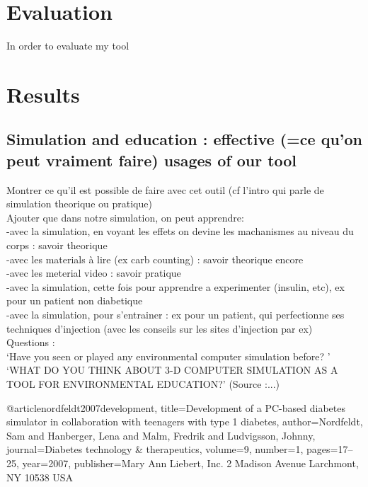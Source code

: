 \section{Evaluation}
In order to evaluate my tool\\

\section{Results}
\subsection{Simulation and education : effective (=ce qu'on peut vraiment faire) usages of our tool}
\label{sec:simulationUsages}
Montrer ce qu'il est possible de faire avec cet outil (cf l'intro qui parle de simulation theorique ou pratique)\\
Ajouter que dans notre simulation, on peut apprendre:\\
-avec la simulation, en voyant les effets on devine les machanismes au niveau du corps : savoir theorique\\
-avec les materials à lire (ex carb counting) : savoir theorique encore\\
-avec les meterial video : savoir pratique\\
-avec la simulation, cette fois pour apprendre a experimenter (insulin, etc), ex pour un patient non diabetique\\
-avec la simulation, pour s'entrainer : ex pour un patient, qui perfectionne ses techniques d'injection (avec les conseils sur les sites d'injection par ex)\\

Questions :\\
`Have you seen or played any environmental computer simulation before? '
`WHAT DO YOU THINK ABOUT 3-D COMPUTER SIMULATION AS A TOOL FOR ENVIRONMENTAL EDUCATION?'
(Source :...)%

\cite{pmid17316094} %


@article{nordfeldt2007development,
  title={Development of a PC-based diabetes simulator in collaboration with teenagers with type 1 diabetes},
  author={Nordfeldt, Sam and Hanberger, Lena and Malm, Fredrik and Ludvigsson, Johnny},
  journal={Diabetes technology \& therapeutics},
  volume={9},
  number={1},
  pages={17--25},
  year={2007},
  publisher={Mary Ann Liebert, Inc. 2 Madison Avenue Larchmont, NY 10538 USA}
}


